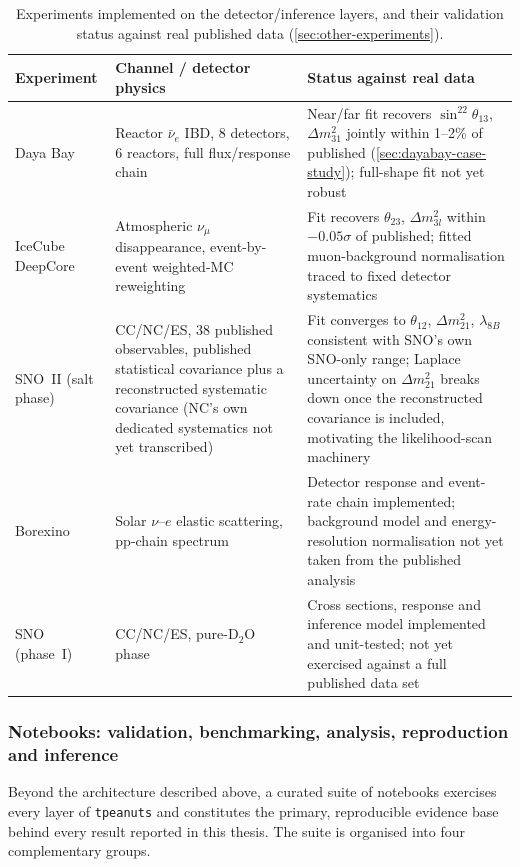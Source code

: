 \begin{table}[htbp]
  \centering
  \footnotesize
  \caption{Experiments implemented on the detector/inference layers, and their validation status against real published data (\cref{sec:other-experiments}).}
  \label{tab:detector-experiments}
  \begin{tabularx}{\textwidth}{lXX}
    \toprule
    Experiment & Channel / detector physics & Status against real data \\
    \midrule
    Daya Bay & Reactor \(\bar\nu_e\) IBD, 8 detectors, 6 reactors, full flux/response chain & Near/far fit recovers \(\sin^22\theta_{13}\), \(\Delta m^2_{31}\) jointly within 1--2\% of published (\cref{sec:dayabay-case-study}); full-shape fit not yet robust \\
    IceCube DeepCore & Atmospheric \(\nu_\mu\) disappearance, event-by-event weighted-MC reweighting & Fit recovers \(\theta_{23}\), \(\Delta m^2_{3l}\) within \(-0.05\sigma\) of published; fitted muon-background normalisation traced to fixed detector systematics \\
    SNO~II (salt phase) & CC/NC/ES, 38 published observables, published statistical covariance plus a reconstructed systematic covariance (NC's own dedicated systematics not yet transcribed) & Fit converges to \(\theta_{12}\), \(\Delta m^2_{21}\), \(\lambda_{8B}\) consistent with SNO's own SNO-only range; Laplace uncertainty on \(\Delta m^2_{21}\) breaks down once the reconstructed covariance is included, motivating the likelihood-scan machinery \\
    Borexino & Solar \(\nu\)--\(e\) elastic scattering, pp-chain spectrum & Detector response and event-rate chain implemented; background model and energy-resolution normalisation not yet taken from the published analysis \\
    SNO (phase~I) & CC/NC/ES, pure-D\(_2\)O phase & Cross sections, response and inference model implemented and unit-tested; not yet exercised against a full published data set \\
    \bottomrule
  \end{tabularx}
\end{table}

\subsubsection{Notebooks: validation, benchmarking, analysis, reproduction and inference}

Beyond the architecture described above, a curated suite of notebooks exercises every layer of \texttt{tpeanuts} and constitutes the primary, reproducible evidence base behind every result reported in this thesis. The suite is organised into four complementary groups.

